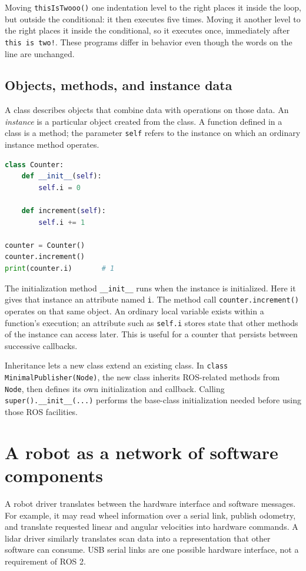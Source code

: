 Moving \texttt{thisIsTwooo()} one indentation level to the right places
it inside the loop, but outside the conditional: it then executes five
times. Moving it another level to the right places it inside the conditional,
so it executes once, immediately after \texttt{this is two!}. These programs
differ in behavior even though the words on the line are unchanged.

\subsection{Objects, methods, and instance data}
A class describes objects that combine data with operations on those data.
An \emph{instance} is a particular object created from the class. A function
defined in a class is a method; the parameter \texttt{self} refers to the
instance on which an ordinary instance method operates.
\begin{lstlisting}[style=robotcode,language=Python]
class Counter:
    def __init__(self):
        self.i = 0

    def increment(self):
        self.i += 1

counter = Counter()
counter.increment()
print(counter.i)       # 1
\end{lstlisting}
The initialization method \texttt{\_\_init\_\_} runs when the instance is
initialized. Here it gives that instance an attribute named \texttt{i}.
The method call \texttt{counter.increment()} operates on that same object.
An ordinary local variable exists within a function's execution; an
attribute such as \texttt{self.i} stores state that other methods of the
instance can access later. This is useful for a counter that persists
between successive callbacks.

Inheritance lets a new class extend an existing class. In
\texttt{class MinimalPublisher(Node)}, the new class inherits ROS-related
methods from \texttt{Node}, then defines its own initialization and callback.
Calling \texttt{super().\_\_init\_\_(...)} performs the base-class
initialization needed before using those ROS facilities.

\section{A robot as a network of software components}
\label{sec:l14-architecture}
A robot driver translates between the hardware interface and software
messages. For example, it may read wheel information over a serial link,
publish odometry, and translate requested linear and angular velocities
into hardware commands. A lidar driver similarly translates scan data
into a representation that other software can consume. USB serial links
are one possible hardware interface, not a requirement of ROS 2.

